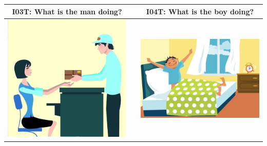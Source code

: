 \documentclass[12pt,notitlepage]{article}
\begin{document}
\begin{center}
\begin{tabular}{|c|c|c|}
\hline
I03T: What is the man doing? && I04T: What is the boy doing? \\
\hline
\includegraphics[width=20em,trim=0 0 0 -3]{figures/I03.jpg} & & \includegraphics[width=20em,trim=0 0 0 -3]{figures/I04.jpg} \\
\hline
\end{tabular}
\vspace{1em} \\



\end{center}
\end{document}
